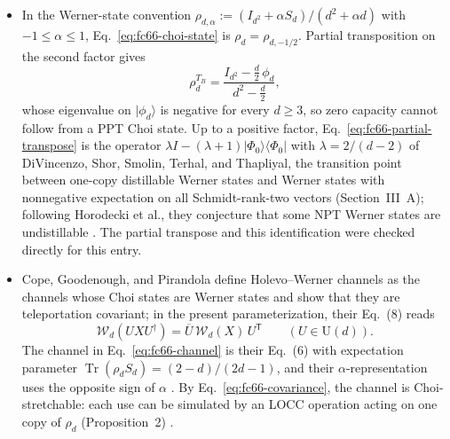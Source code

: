 \begin{itemize}
  \item In the Werner-state convention
  $\rho_{d,\alpha}:=(I_{d^2}+\alpha S_d)/(d^2+\alpha d)$ with
  $-1\leq\alpha\leq1$, Eq.~\eqref{eq:fc66-choi-state} is
  $\rho_d=\rho_{d,-1/2}$.  Partial transposition on the second factor gives
  \begin{equation}
    \rho_d^{T_B}=\frac{I_{d^2}-\frac d2\,\phi_d}{d^2-\frac d2},
    \label{eq:fc66-partial-transpose}
  \end{equation}
  whose eigenvalue on $\lvert\phi_d\rangle$ is negative for every $d\geq3$, so
  zero capacity cannot follow from a PPT Choi state.  Up to a positive factor,
  Eq.~\eqref{eq:fc66-partial-transpose} is the operator
  $\lambda I-(\lambda+1)\lvert\Phi_0\rangle\!\langle\Phi_0\rvert$ with
  $\lambda=2/(d-2)$ of DiVincenzo, Shor, Smolin, Terhal, and Thapliyal, the
  transition point between one-copy distillable Werner states and Werner
  states with nonnegative expectation on all Schmidt-rank-two vectors
  (Section~III~A); following Horodecki et al., they conjecture that some NPT
  Werner states are undistillable
  .  The partial transpose and
  this identification were checked directly for this entry.

  \item Cope, Goodenough, and Pirandola define Holevo--Werner channels as the
  channels whose Choi states are Werner states and show that they are
  teleportation covariant; in the present parameterization, their Eq.~(8)
  reads
  \begin{equation}
    \mathcal W_d(UXU^\dagger)=\overline U\,\mathcal W_d(X)\,U^{\mathsf T}
    \qquad(U\in\mathrm U(d)).
    \label{eq:fc66-covariance}
  \end{equation}
  The channel in Eq.~\eqref{eq:fc66-channel} is their Eq.~(6) with expectation
  parameter $\operatorname{Tr}(\rho_dS_d)=(2-d)/(2d-1)$, and their
  $\alpha$-representation uses the opposite sign of $\alpha$
  .  By
  Eq.~\eqref{eq:fc66-covariance}, the channel is Choi-stretchable: each use
  can be simulated by an LOCC operation acting on one copy of $\rho_d$
  (Proposition~2) .


\end{itemize}
